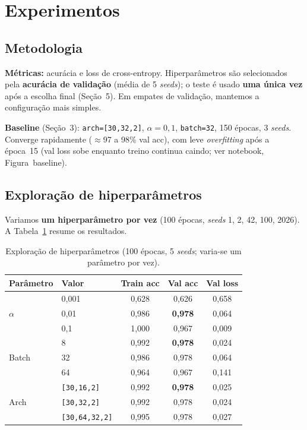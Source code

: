 \documentclass[a4paper,11pt]{article}
\begin{document}
\section{Experimentos}

\subsection{Metodologia}

\textbf{Métricas:} acurácia e loss de cross-entropy. Hiperparâmetros são selecionados pela \textbf{acurácia de validação} (média de 5 \emph{seeds}); o teste é usado \textbf{uma única vez} após a escolha final (Seção~5). Em empates de validação, mantemos a configuração mais simples.

\textbf{Baseline} (Seção~3): \texttt{arch=[30,32,2]}, $\alpha=0{,}1$, \texttt{batch=32}, 150 épocas, 3 \emph{seeds}. Converge rapidamente ($\approx$97 a 98\% val acc), com leve \emph{overfitting} após a época~15 (val loss sobe enquanto treino continua caindo; ver notebook, Figura~baseline).

\subsection{Exploração de hiperparâmetros}

Variamos \textbf{um hiperparâmetro por vez} (100 épocas, \emph{seeds} 1, 2, 42, 100, 2026). A Tabela~\ref{tab:hyper} resume os resultados.

\begin{table}[H]
    \centering
    \caption{Exploração de hiperparâmetros (100 épocas, 5 \emph{seeds}; varia-se um parâmetro por vez).}
    \label{tab:hyper}
    \small
    \begin{tabular}{llccc}
        \toprule
        Parâmetro & Valor & Train acc & Val acc & Val loss \\
        \midrule
        \multirow{3}{*}{$\alpha$} & 0{,}001 & 0{,}628 & 0{,}626 & 0{,}658 \\
        & 0{,}01  & 0{,}986 & \textbf{0{,}978} & 0{,}064 \\
        & 0{,}1   & 1{,}000 & 0{,}967 & 0{,}009 \\
        \midrule
        \multirow{3}{*}{Batch} & 8  & 0{,}992 & \textbf{0{,}978} & 0{,}024 \\
        & 32 & 0{,}986 & 0{,}978 & 0{,}064 \\
        & 64 & 0{,}964 & 0{,}967 & 0{,}141 \\
        \midrule
        \multirow{3}{*}{Arch} & \texttt{[30,16,2]}    & 0{,}992 & \textbf{0{,}978} & 0{,}025 \\
        & \texttt{[30,32,2]}    & 0{,}992 & 0{,}978 & 0{,}024 \\
        & \texttt{[30,64,32,2]} & 0{,}995 & 0{,}978 & 0{,}027 \\
        \bottomrule
    \end{tabular}
\end{table}
\end{document}
